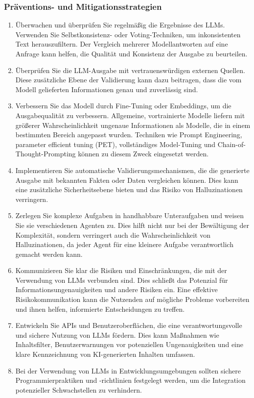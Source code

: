\documentclass[
]{article}
\providecommand{\tightlist}{%
  \setlength{\itemsep}{0pt}\setlength{\parskip}{0pt}}
\begin{document}
\subsubsection{Präventions- und
Mitigationsstrategien}\label{pruxe4ventions--und-mitigationsstrategien}

\begin{enumerate}
\def\labelenumi{\arabic{enumi}.}
\tightlist
\item
  Überwachen und überprüfen Sie regelmäßig die Ergebnisse des LLMs.
  Verwenden Sie Selbstkonsistenz- oder Voting-Techniken, um
  inkonsistenten Text herauszufiltern. Der Vergleich mehrerer
  Modellantworten auf eine Anfrage kann helfen, die Qualität und
  Konsistenz der Ausgabe zu beurteilen.
\item
  Überprüfen Sie die LLM-Ausgabe mit vertrauenswürdigen externen
  Quellen. Diese zusätzliche Ebene der Validierung kann dazu beitragen,
  dass die vom Modell gelieferten Informationen genau und zuverlässig
  sind.
\item
  Verbessern Sie das Modell durch Fine-Tuning oder Embeddings, um die
  Ausgabequalität zu verbessern. Allgemeine, vortrainierte Modelle
  liefern mit größerer Wahrscheinlichkeit ungenaue Informationen als
  Modelle, die in einem bestimmten Bereich angepasst wurden. Techniken
  wie Prompt Engineering, parameter efficient tuning (PET),
  vollständiges Model-Tuning und Chain-of-Thought-Prompting können zu
  diesem Zweck eingesetzt werden.
\item
  Implementieren Sie automatische Validierungsmechanismen, die die
  generierte Ausgabe mit bekannten Fakten oder Daten vergleichen können.
  Dies kann eine zusätzliche Sicherheitsebene bieten und das Risiko von
  Halluzinationen verringern.
\item
  Zerlegen Sie komplexe Aufgaben in handhabbare Unteraufgaben und weisen
  Sie sie verschiedenen Agenten zu. Dies hilft nicht nur bei der
  Bewältigung der Komplexität, sondern verringert auch die
  Wahrscheinlichkeit von Halluzinationen, da jeder Agent für eine
  kleinere Aufgabe verantwortlich gemacht werden kann.
\item
  Kommunizieren Sie klar die Risiken und Einschränkungen, die mit der
  Verwendung von LLMs verbunden sind. Dies schließt das Potenzial für
  Informationsungenauigkeiten und andere Risiken ein. Eine effektive
  Risikokommunikation kann die Nutzenden auf mögliche Probleme
  vorbereiten und ihnen helfen, informierte Entscheidungen zu treffen.
\item
  Entwickeln Sie APIs und Benutzeroberflächen, die eine
  verantwortungsvolle und sichere Nutzung von LLMs fördern. Dies kann
  Maßnahmen wie Inhaltsfilter, Benutzerwarnungen vor potenziellen
  Ungenauigkeiten und eine klare Kennzeichnung von KI-generierten
  Inhalten umfassen.
\item
  Bei der Verwendung von LLMs in Entwicklungsumgebungen sollten sichere
  Programmierpraktiken und -richtlinien festgelegt werden, um die
  Integration potenzieller Schwachstellen zu verhindern.
\end{enumerate}
\end{document}
